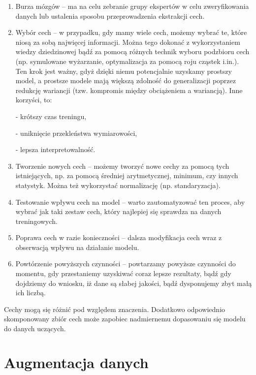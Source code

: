 \begin{enumerate}
	\item Burza mózgów – ma na celu zebranie grupy ekspertów w celu zweryfikowania danych lub ustalenia sposobu przeprowadzenia ekstrakcji cech.

	\item Wybór cech – w przypadku, gdy mamy wiele cech, możemy wybrać te, które niosą za sobą najwięcej informacji. Można tego dokonać z wykorzystaniem wiedzy dziedzinowej bądź za pomocą różnych technik wyboru podzbioru cech (np. symulowane wyżarzanie, optymalizacja za pomocą roju cząstek i.in.). Ten krok jest ważny, gdyż dzięki niemu potencjalnie uzyskamy prostszy model, a prostsze modele mają większą zdolność do generalizacji poprzez redukcję wariancji (tzw. kompromis między obciążeniem a wariancją). Inne korzyści, to:

	- krótszy czas treningu,

	- uniknięcie przekleństwa wymiarowości,

	- lepsza interpretowalność.

	\item Tworzenie nowych cech – możemy tworzyć nowe cechy za pomocą tych istniejących, np. za pomocą średniej arytmetycznej, minimum, czy innych statystyk. Można też wykorzystać normalizację (np. standaryzacja).

	\item Testowanie wpływu cech na model – warto zautomatyzować ten proces, aby wybrać jak taki zestaw cech, który najlepiej się sprawdza na danych treningowych.

	\item Poprawa cech w razie konieczności – dalsza modyfikacja cech wraz z obserwacją wpływu na działanie modelu.

	\item Powtórzenie powyższych czynności – powtarzamy powyższe czynności do momentu, gdy przestaniemy uzyskiwać coraz lepsze rezultaty, bądź gdy dojdziemy do wniosku, iż dane są słabej jakości, bądź dysponujemy zbyt małą ich liczbą.
\end{enumerate}

\noindent Cechy mogą się różnić pod względem znaczenia. Dodatkowo odpowiednio skomponowany zbiór cech może zapobiec nadmiernemu dopasowaniu się modelu do danych uczących. 

\section{Augmentacja danych}
\label{cha:cha3.4}

